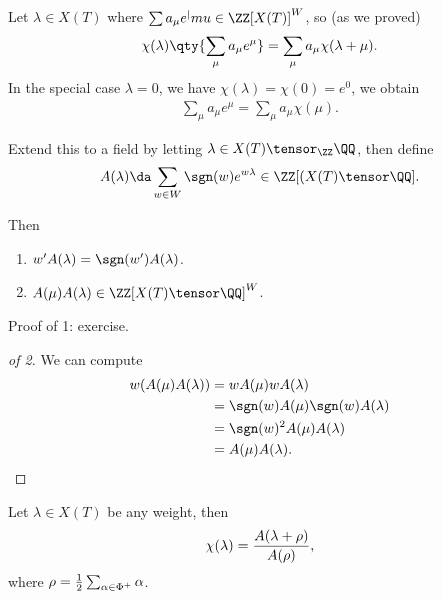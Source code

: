 \begin{lemma}[?]

Let \(\lambda \in X(T)\) where \(\sum a_\mu e^|mu \in \ZZ[X(T)]^W\), so
(as we proved)
\begin{align*}  
\chi(\lambda) \qty{ \sum_\mu a_\mu e^\mu } = \sum_\mu a_\mu \chi(\lambda + \mu)
.\end{align*} In the special case \(\lambda = 0\), we have
\(\chi(\lambda) = \chi(0) = e^0\), we obtain
\begin{align*}  
\sum_\mu a_\mu e^\mu = \sum_\mu a_\mu \chi(\mu)
.\end{align*}

Extend this to a field by letting \(\lambda \in X(T) \tensor_\ZZ \QQ\),
then define
\begin{align*}  
A(\lambda) \da \sum_{w\in W} \sgn(w) e^{w \lambda} \in \ZZ[ (X(T) \tensor \QQ]
.\end{align*}

Then

\begin{enumerate}
\def\labelenumi{\arabic{enumi}.}
\item
  \(w' A(\lambda) = \sgn(w') A(\lambda)\).
\item
  \(A(\mu) A(\lambda) \in \ZZ[X(T) \tensor \QQ]^W\).
\end{enumerate}

\end{lemma}

Proof of 1: exercise.

\begin{proof}[of 2]

We can compute
\begin{align*}  
w(A(\mu) A(\lambda) ) 
&= w A(\mu)  w A(\lambda) \\
&= \sgn(w) A(\mu)  \sgn(w) A(\lambda) \\
&= \sgn(w)^2 A(\mu) A(\lambda) \\
&= A(\mu) A(\lambda)
.\end{align*}

\end{proof}

\begin{theorem}

Let \(\lambda \in X(T)\) be any weight, then
\begin{align*}  
\chi(\lambda) = { A(\lambda + \rho) \over A(\rho) }
,\end{align*} where
\(\rho = {1\over 2} \sum_{\alpha \in \Phi^+} \alpha\).

\end{theorem}

